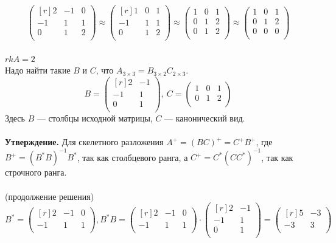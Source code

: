 \documentclass[12pt]{article}
\theoremstyle{definition}
\numberwithin{equation}{section}
\begin{document}
	\[\begin{pmatrix}[r]
	2 & -1 & 0 \\         
	-1 & 1 & 1 \\
	0 & 1 & 2 \\
	\end{pmatrix} \approx \begin{pmatrix}[r]
	1 & 0 & 1 \\         
	-1 & 1 & 1\\
	0 & 1 & 2\\
	\end{pmatrix} \approx \begin{pmatrix}
	1 & 0 & 1 \\         
	0 & 1 & 2 \\
	0 & 1 & 2 \\
	\end{pmatrix} \approx \begin{pmatrix}
	1 & 0 & 1 \\         
	0 & 1 & 2 \\
	0 & 0 & 0 \\
	\end{pmatrix}\]\\
	$rkA=2$\\
	Надо найти такие $B$ и $C$, что $A_{3 \times 3}=B_{3 \times 2}C_{2 \times 3}$.
	\[B = \begin{pmatrix}[r]
	2 & -1 \\         
	-1 & 1 \\
	0 & 1 \\
	\end{pmatrix}, ~ C = \begin{pmatrix}
	1 & 0 & 1 \\         
	0 & 1 & 2 \\
	\end{pmatrix}\]
	Здесь $B$ --- столбцы исходной матрицы, $C$ --- канонический вид.\\ \\
	\textbf{Утверждение.}
	Для скелетного разложения $A^+=(BC)^+=C^+B^+$, где 
	$B^+=(B^*B)^{-1}B^*$, так как столбцевого ранга, а
	$C^+=C^*(CC^*)^{-1}$, так как строчного ранга.\\ \\
	(продолжение решения)
	\[B^* = \begin{pmatrix}[r]
	2 & -1 & 0 \\         
	-1 & 1 & 1 \\
	\end{pmatrix}, B^*B = \begin{pmatrix}[r]
	2 & -1 & 0 \\         
	-1 & 1 & 1 \\
	\end{pmatrix} \cdot \begin{pmatrix}[r]
	2 & -1 \\         
	-1 & 1 \\
	0 & 1 \\
	\end{pmatrix} = \begin{pmatrix}[r]
	5 & -3 \\         
	-3 & 3 \\
	\end{pmatrix}\]\\
\end{document}
